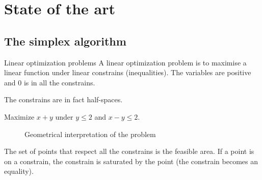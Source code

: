 \section{State of the art}
\subsection{The simplex algorithm}

\begin{frame}{Linear optimization problems}
A linear optimization problem is to maximise a linear function under linear constrains (inequalities). The variables are positive and $0$ is in all the constrains. 

The constrains are in fact half-spaces.
\begin{example}

Maximize $x+y$ under $y\leq 2$ and $x-y\leq 2$.
\vspace*{-0.5cm}
\begin{figure}
\caption{Geometrical interpretation of the problem}
\end{figure}
\vspace*{-0.5cm}
\end{example}
The set of points that respect all the constrains is the feasible area. If a point is on a constrain, the constrain is saturated by the point (the constrain becomes an equality). 
\end{frame}

